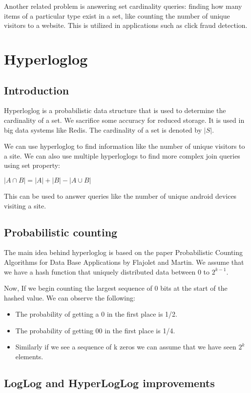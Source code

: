 \documentclass[twoside]{article}
\begin{document}
\par
Another related problem is answering set cardinality queries: finding how many items of a particular type exist in a set, like counting the number of unique visitors to a website. This is utilized in applications such as click fraud detection.


\section{Hyperloglog}
\subsection{Introduction}
\par
Hyperloglog is a probabilistic data structure that is used to determine the cardinality of a set. We sacrifice some accuracy for reduced storage. It is used in big data systems like Redis. The cardinality of a set is denoted by $ |S| $.
\par
We can use hyperloglog to find information like the number of unique visitors to a site. We can also use multiple hyperloglogs to find more complex join queries using set property:

$|A \cap B|=|A|+|B|-|A \cup B|  $

\par

This can be used to answer queries like the number of unique android devices visiting a site. 

\subsection{Probabilistic counting}
The main idea behind hyperloglog is based on the paper Probabilistic Counting Algorithms for Data Base Applications by Flajolet and Martin. We assume that we have a hash function that uniquely distributed data between 0 to $2^{k-1}$. 
\par
Now, If we begin counting the largest sequence of  0 bits at the start of the hashed value. We can observe the following:
\begin{itemize}
\item The probability of getting a 0 in the first place is 1/2.
\item The probability of getting 00 in the first place is 1/4. 
\item Similarly if we see a sequence of k zeros we can assume that we have seen $2^k$ elements. 
\end{itemize}
\subsection{LogLog and HyperLogLog improvements}
\end{document}
